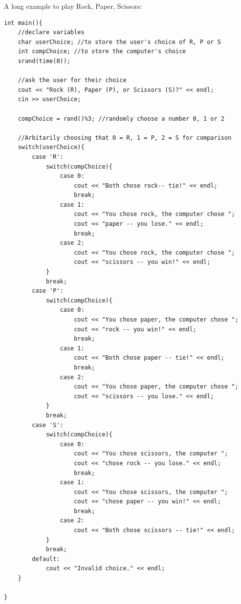 \begin{example}
    A long example to play Rock, Paper, Scissors:

    \begin{verbatim}
int main(){
    //declare variables
    char userChoice; //to store the user's choice of R, P or S
    int compChoice; //to store the computer's choice
    srand(time(0));

    //ask the user for their choice
    cout << "Rock (R), Paper (P), or Scissors (S)?" << endl;
    cin >> userChoice;

    compChoice = rand()%3; //randomly choose a number 0, 1 or 2

    //Arbitarily choosing that 0 = R, 1 = P, 2 = S for comparison
    switch(userChoice){
        case 'R':
            switch(compChoice){
                case 0: 
                    cout << "Both chose rock-- tie!" << endl;
                    break;
                case 1:
                    cout << "You chose rock, the computer chose ";
                    cout << "paper -- you lose." << endl;
                    break;
                case 2:
                    cout << "You chose rock, the computer chose ";
                    cout << "scissors -- you win!" << endl;
            }
            break;
        case 'P':
            switch(compChoice){
                case 0: 
                    cout << "You chose paper, the computer chose ";
                    cout << "rock -- you win!" << endl;
                    break;
                case 1:
                    cout << "Both chose paper -- tie!" << endl;
                    break;
                case 2:
                    cout << "You chose paper, the computer chose ";
                    cout << "scissors -- you lose." << endl;
            }
            break;
        case 'S':
            switch(compChoice){
                case 0: 
                    cout << "You chose scissors, the computer "; 
                    cout << "chose rock -- you lose." << endl;
                    break;
                case 1:
                    cout << "You chose scissors, the computer "; 
                    cout << "chose paper -- you win!" << endl;
                    break;
                case 2:
                    cout << "Both chose scissors -- tie!" << endl;
            }
            break;
        default:
            cout << "Invalid choice." << endl;
    }

}

    \end{verbatim}
\end{example}


